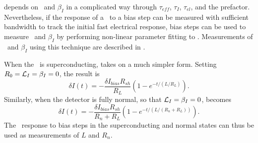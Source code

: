  depends on \Loop\ and $\beta_I$ in a complicated way through $\tau_{eff}$, $\tau_I$, $\tau_{el}$, and the prefactor.
Nevertheless, if the response of a \TES\ to a bias step can be measured with sufficient bandwidth to track the initial fast electrical response, bias steps can be used to measure \Loop\ and $\beta_I$ by performing non-linear parameter fitting to .
Measurements of \Loop\ and $\beta_I$ using this technique are described in .

When the \TES\ is superconducting,  takes on a much simpler form.
Setting $R_0 = \mathcal{L}_I = \beta_I = 0$, the result is
\begin{equation}\label{eqn:bias-step-resp-sc}
\delta I(t)
   = - \frac{\delta I_{bias} R_{sh}}{R_{L}} 
       \left(1 - e^{-t/(L/R_L)} \right).
\end{equation}
Similarly, when the detector is fully normal, so that $\mathcal{L}_I = \beta_I = 0$,  becomes
\begin{equation}\label{eqn:bias-step-resp-normal}
\delta I(t)
   = - \frac{\delta I_{bias} R_{sh}}{R_n + R_{L}} 
       \left(1 - e^{-t/(L/(R_n+R_L))} \right).
\end{equation}
The \TES\ response to bias steps in the superconducting and normal states can thus be used as measurements of $L$ and $R_n$.

